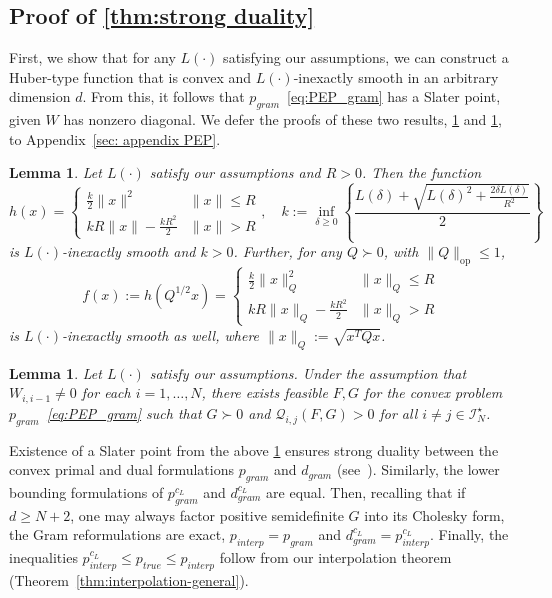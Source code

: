 \documentclass[11pt, hidelinks]{article}
\numberwithin{equation}{section}
\theoremstyle{thmstyletwo}%
\newtheorem{lemma}[thm]{Lemma}
\numberwithin{equation}{section}
\newcommand{\Ical}{\mathcal{I}}
\newcommand{\pPEP}[1]{p_{#1}}
\newcommand{\dPEP}[1]{d_{#1}}
\begin{document}
\subsection{Proof of \cref{thm:strong duality}}

First, we show that for any $L(\cdot)$ satisfying our assumptions, we can construct a Huber-type function that is convex and $L(\cdot)$-inexactly smooth in an arbitrary dimension $d$. From this, it follows that $\pPEP{gram}$~\eqref{eq:PEP_gram} has a Slater point, given $W$ has nonzero diagonal. We defer the proofs of these two results, \cref{lemma:inexactly_smooth_construction} and \cref{lemma:slater point}, to Appendix~\ref{sec: appendix PEP}.

\begin{lemma}\label{lemma:inexactly_smooth_construction}
    Let $L(\cdot)$ satisfy our assumptions and $R> 0$. Then the function $$h(x) = \begin{cases}
        \frac{k}{2}\|x\|^2 & \|x\| \leq R\\
        kR\|x\|-\frac{kR^2}{2} & \|x\| > R
    \end{cases}, \quad k := \inf_{\delta \geq 0} \left\{\frac{L\left(\delta\right)+\sqrt{L\left(\delta\right)^{2}+\frac{2\delta L\left(\delta\right)}{R^2}}}{2}\right\}  $$
    is $L(\cdot)$-inexactly smooth and $k > 0$.
    Further, for any $Q\succ 0$, with $\|Q\|_{\mathrm{op}} \leq 1$, $$f(x) := h(Q^{1/2}x) =  \begin{cases}
        \frac{k}{2}\|x\|_Q^2 & \|x\|_Q \leq R\\
        kR\|x\|_Q-\frac{kR^2}{2} & \|x\|_Q > R
    \end{cases}$$ is $L(\cdot)$-inexactly smooth as well, where $\|x\|_Q := \sqrt{x^TQx}$.
  
\end{lemma}

\begin{lemma}\label{lemma:slater point}
    Let $L(\cdot)$ satisfy our assumptions. Under the assumption that $W_{i,i-1} \ne 0$ for each $i = 1, \dots, N$, there exists feasible $F, G$ for the convex problem $\pPEP{gram}$~\eqref{eq:PEP_gram} such that $G \succ 0$ and $\mathcal{Q}_{i,j} (F,G) > 0$ for all $i \ne j \in \Ical_N^\star$. 
\end{lemma}

Existence of a Slater point from the above \cref{lemma:slater point} ensures strong duality between the convex primal and dual formulations $\pPEP{gram}$ and $\dPEP{gram}$ (see~\cite[Theorem 28.2]{rockafeller}). Similarly, the lower bounding formulations of $\pPEP{gram}^{c_L}$ and $\dPEP{gram}^{c_L}$ are equal. Then, recalling that if $d \geq N+2$, one may always factor positive semidefinite $G$ into its Cholesky form, the Gram reformulations are exact, $\pPEP{interp} = \pPEP{gram}$ and $\dPEP{gram}^{c_L} = \pPEP{interp}^{c_L}$. Finally, the inequalities $\pPEP{interp}^{c_L} \leq \pPEP{true} \leq \pPEP{interp}$ follow from our interpolation theorem (Theorem~\ref{thm:interpolation-general}).
\end{document}
